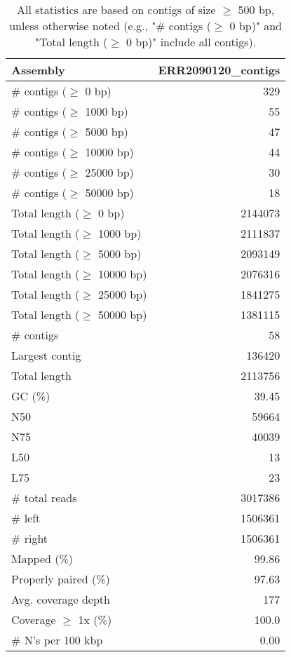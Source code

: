 \documentclass[12pt,a4paper]{article}
\begin{document}
\begin{table}[ht]
\begin{center}
\caption{All statistics are based on contigs of size $\geq$ 500 bp, unless otherwise noted (e.g., "\# contigs ($\geq$ 0 bp)" and "Total length ($\geq$ 0 bp)" include all contigs).}
\begin{tabular}{|l*{1}{|r}|}
\hline
Assembly & ERR2090120\_contigs \\ \hline
\# contigs ($\geq$ 0 bp) & 329 \\ \hline
\# contigs ($\geq$ 1000 bp) & 55 \\ \hline
\# contigs ($\geq$ 5000 bp) & 47 \\ \hline
\# contigs ($\geq$ 10000 bp) & 44 \\ \hline
\# contigs ($\geq$ 25000 bp) & 30 \\ \hline
\# contigs ($\geq$ 50000 bp) & 18 \\ \hline
Total length ($\geq$ 0 bp) & 2144073 \\ \hline
Total length ($\geq$ 1000 bp) & 2111837 \\ \hline
Total length ($\geq$ 5000 bp) & 2093149 \\ \hline
Total length ($\geq$ 10000 bp) & 2076316 \\ \hline
Total length ($\geq$ 25000 bp) & 1841275 \\ \hline
Total length ($\geq$ 50000 bp) & 1381115 \\ \hline
\# contigs & 58 \\ \hline
Largest contig & 136420 \\ \hline
Total length & 2113756 \\ \hline
GC (\%) & 39.45 \\ \hline
N50 & 59664 \\ \hline
N75 & 40039 \\ \hline
L50 & 13 \\ \hline
L75 & 23 \\ \hline
\# total reads & 3017386 \\ \hline
\# left & 1506361 \\ \hline
\# right & 1506361 \\ \hline
Mapped (\%) & 99.86 \\ \hline
Properly paired (\%) & 97.63 \\ \hline
Avg. coverage depth & 177 \\ \hline
Coverage $\geq$ 1x (\%) & 100.0 \\ \hline
\# N's per 100 kbp & 0.00 \\ \hline
\end{tabular}
\end{center}
\end{table}
\end{document}
